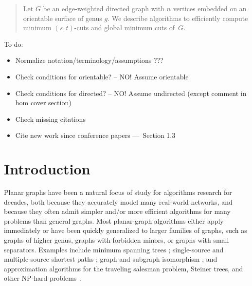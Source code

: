 \documentclass[11pt,twoside]{article}
\begin{document}
\begin{titlepage}
\begin{abstract}
Let $G$ be an edge-weighted directed graph with $n$ vertices embedded on an orientable surface of genus $g$.
We describe algorithms to efficiently compute minimum $(s,t)$-cuts and global minimum cuts of~$G$.
\end{abstract}


\bigskip
\begin{TODO}\noindent
To do:
\begin{itemize}\itemsep0pt
\item Normalize notation/terminology/assumptions ???
\item Check conditions for orientable? -- NO!  Assume orientable
\item Check conditions for directed? -- NO! Assume undirected (except comment in hom cover section)
\item Check missing citations
\item Cite new work since conference papers — Section 1.3
\end{itemize}
\end{TODO}

\noindent

\thispagestyle{empty}
\setcounter{page}{0}
\end{titlepage}


\section{Introduction}
\label{sec:intro}



Planar graphs have been a natural focus of study for algorithms research for decades, both because they accurately model many real-world networks, and because they often admit simpler and/or more efficient algorithms for many problems than general graphs.  Most planar-graph algorithms either apply immediately or have been quickly generalized to larger families of graphs, such as graphs of higher genus, graphs with forbidden minors, or graphs with small separators.  Examples include minimum spanning trees \cite{p-omst-99, m-tltam-04}; single-source and multiple-source shortest paths \cite{cc-msspg-07, fr-pgnwe-06, hkrs-fspap-97, k-msspp-05, kmw-spdpg-09, lrt-gnd-79, tm-spltm-09}; graph and subgraph isomorphism \cite{g-itegd-00, hw-ltaip-74, m-itgbg-80, e-sipgr-99, e-dtmcg-00}; and approximation algorithms for the traveling salesman problem, Steiner trees, and other NP-hard problems~\cite{bdt-ptass-08, bkk-ptass-07, bkk-stpg-07, dhm-aacd-07, e-dtmcg-00}.
\end{document}
